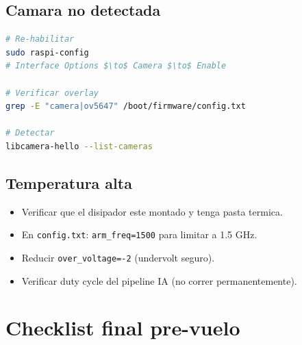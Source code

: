 \documentclass[11pt,a4paper,oneside]{report}
\begin{document}
\section{Camara no detectada}

\begin{lstlisting}[language=bash]
# Re-habilitar
sudo raspi-config
# Interface Options $\to$ Camera $\to$ Enable

# Verificar overlay
grep -E "camera|ov5647" /boot/firmware/config.txt

# Detectar
libcamera-hello --list-cameras
\end{lstlisting}

\section{Temperatura alta}

\begin{itemize}[leftmargin=2em]
  \item Verificar que el disipador este montado y tenga pasta termica.
  \item En \texttt{config.txt}: \texttt{arm\_freq=1500} para limitar a 1.5 GHz.
  \item Reducir \texttt{over\_voltage=-2} (undervolt seguro).
  \item Verificar duty cycle del pipeline IA (no correr permanentemente).
\end{itemize}

\chapter{Checklist final pre-vuelo}
\end{document}
